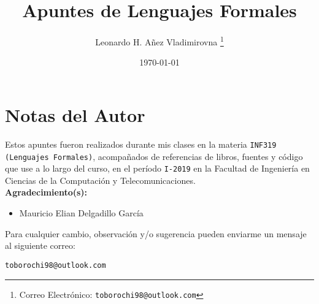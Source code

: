 

\title{Apuntes de Lenguajes Formales}

\author{Leonardo H. Añez Vladimirovna%
  \thanks{Correo Electrónico: \texttt{toborochi98@outlook.com}}}
\date{\today}

\maketitle


\section*{Notas del Autor}
Estos apuntes fueron realizados durante mis clases en la materia \texttt{INF319 (Lenguajes Formales)}, acompañados de referencias de libros, fuentes y código que use a lo largo del curso, en el período \texttt{I-2019} en la Facultad de Ingeniería en Ciencias de la Computación y Telecomunicaciones. \\${ }$\\
\textbf{Agradecimiento(s):}
\begin{itemize}
\item Mauricio Elian Delgadillo García

\end{itemize}

Para cualquier cambio, observación y/o sugerencia pueden enviarme un mensaje al siguiente correo:
\begin{center}
 \texttt{toborochi98@outlook.com}
\end{center}

\tableofcontents
